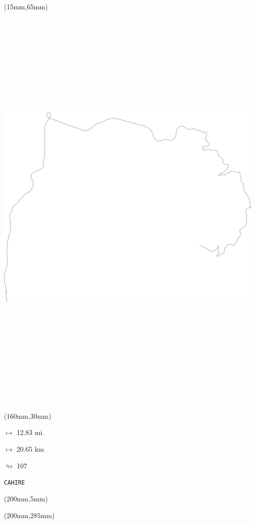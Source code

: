 \begin{textblock*}{185mm}(15mm,65mm)%
\centering
\mbox{\includegraphics[width=185mm,height=210mm,keepaspectratio]{PT/CAHIRE.pdf}}
\end{textblock*}
\begin{textblock*}{40mm}(160mm,30mm)%
\Large
\par$\mapsto$ 12.83 mi.
\par$\mapsto$ 20.65 km
\par$\looparrowright$ 107
\par\hfill\tiny\tt CAHIRE\\
\end{textblock*}
\begin{textblock*}{20mm}(200mm,5mm)%
\fbox{\thepage}
\label{CAHIRE}
\end{textblock*}
\begin{textblock*}{20mm}(200mm,285mm)%
\fbox{\thepage}
\end{textblock*}

